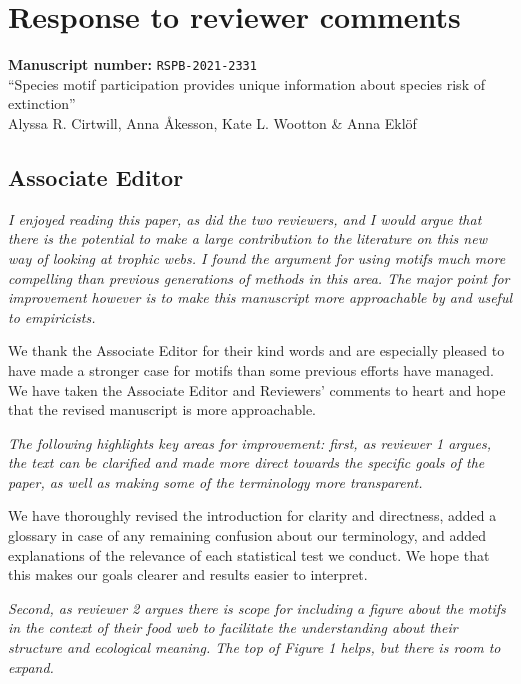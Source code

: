 \documentclass[12pt]{article}
\newcommand{\us}{\rm \setlength{\leftskip}{0.3cm} \setlength{\rightskip}{0.3cm}}
\newcommand{\them}{\it \setlength{\leftskip}{0cm} \setlength{\rightskip}{0cm}}
\begin{document}
 

\section*{Response to reviewer comments}

\begin{flushleft}
\textbf{Manuscript number: } \texttt{RSPB-2021-2331} \\
``Species motif participation provides unique information about species risk of extinction''\\
Alyssa R. Cirtwill, Anna {\AA}kesson, Kate L. Wootton \& Anna Ekl\"of
\end{flushleft}




\subsection*{Associate Editor}
    \them
    I enjoyed reading this paper, as did the two reviewers, and I would argue that there is the potential to make a large contribution to the literature on this new way of looking at trophic webs. I found the argument for using motifs much more compelling than previous generations of methods in this area. The major point for improvement however is to make this manuscript more approachable by and useful to empiricists.  
    
    \us
    We thank the Associate Editor for their kind words and are especially pleased to have made a stronger case for motifs than some previous efforts have managed. We have taken the Associate Editor and Reviewers' comments to heart and hope that the revised manuscript is more approachable.
    
    \them 
    The following highlights key areas for improvement: first, as reviewer 1 argues, the text can be clarified and made more direct towards the specific goals of the paper, as well as making some of the terminology more transparent.  
    
    \us
    We have thoroughly revised the introduction for clarity and directness, added a glossary in case of any remaining confusion about our terminology, and added explanations of the relevance of each statistical test we conduct. We hope that this makes our goals clearer and results easier to interpret. 
    
    \them
    Second, as reviewer 2 argues there is scope for including a figure about the motifs in the context of their food web to facilitate the understanding about their structure and ecological meaning. The top of Figure 1 helps, but there is room to expand.  
    
\end{document}
